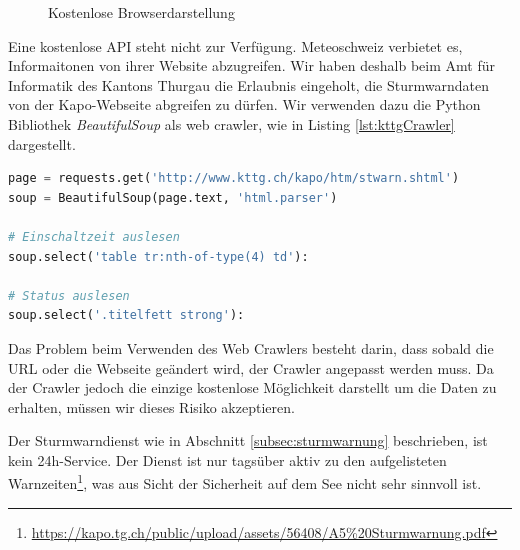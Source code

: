 \begin{figure}[h!]
	\centering
	\caption{Kostenlose Browserdarstellung}
	\label{img:sturm}
\end{figure}

Eine kostenlose API steht nicht zur Verfügung. Meteoschweiz verbietet es, Informaitonen von ihrer Website abzugreifen. Wir haben deshalb beim Amt für Informatik des Kantons Thurgau die Erlaubnis eingeholt, die Sturmwarndaten von der Kapo-Webseite abgreifen zu dürfen. Wir verwenden dazu die Python Bibliothek \textit{BeautifulSoup} als web crawler, wie in Listing \ref{lst:kttgCrawler} dargestellt. \newline

\begin{lstlisting}[label=lst:kttgCrawler,caption=Web Crawler für die Sturmwarndaten, language=python, style=py]
page = requests.get('http://www.kttg.ch/kapo/htm/stwarn.shtml')
soup = BeautifulSoup(page.text, 'html.parser')

# Einschaltzeit auslesen
soup.select('table tr:nth-of-type(4) td'):

# Status auslesen
soup.select('.titelfett strong'):
\end{lstlisting}

Das Problem beim Verwenden des Web Crawlers besteht darin, dass sobald die URL oder die Webseite geändert wird, der Crawler angepasst werden muss. Da der Crawler jedoch die einzige kostenlose Möglichkeit darstellt um die Daten zu erhalten, müssen wir dieses Risiko akzeptieren.

Der Sturmwarndienst wie in Abschnitt \ref{subsec:sturmwarnung} beschrieben, ist kein 24h-Service. Der Dienst ist nur tagsüber aktiv zu den aufgelisteten Warnzeiten\footnote{ \url{https://kapo.tg.ch/public/upload/assets/56408/A5\%20Sturmwarnung.pdf}}, was aus Sicht der Sicherheit auf dem See nicht sehr sinnvoll ist.

